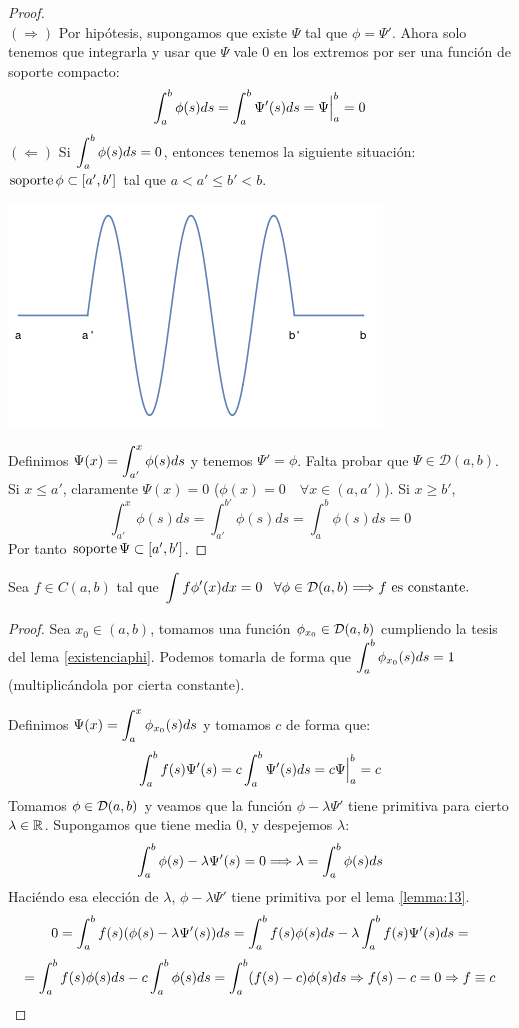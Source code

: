 \begin{proof}
\hfill\\
$(\Rightarrow)$ Por hipótesis, supongamos que existe $\Psi$ tal que $\phi=\Psi'$. Ahora solo tenemos que integrarla y usar que $\Psi$ vale 0 en los extremos por ser una función de soporte compacto:
\[
\displaystyle\int_{ a }^{ b } \phi(s)ds=\displaystyle\int_{ a }^{ b } \Psi'(s)ds=\Psi\Big|_a^b=0
\]
$(\Leftarrow)$  Si $\displaystyle\int_{ a }^{ b } \phi(s)ds=0$, entonces tenemos la siguiente situación: $\operatorname{soporte}\phi\subset[a',b']$ tal que $a<a'\leq b'<b$.

\begin{center}
\includegraphics[scale=0.4]{./img/testfuncion.png}
\end{center}

Definimos $\Psi(x)=\displaystyle\int_{ a' }^{ x } \phi(s)ds$ y tenemos $\Psi'=\phi$. Falta probar que $\Psi\in\mathcal{D}(a,b)$.
Si $x\leq a'$, claramente $\Psi(x)=0$ \big($\phi(x)=0\quad\forall x\in(a,a')$\big). Si $x\geq b'$,
\[
\int_{a'}^x\phi(s)ds=\int_{a'}^{b'}\phi(s)ds=\int_{a}^{b}\phi(s)ds=0
\]
Por tanto $\operatorname{soporte}\Psi\subset[a',b']$.

\end{proof}

\begin{lemma}
\label{lemma:14}
Sea $f\in C(a,b)$ tal que $\displaystyle\int_{  }^{  } f\phi'(x)dx=0\;\;\;\forall\phi\in\mathcal{D}(a,b)\Longrightarrow f \text{ es constante.}$
\end{lemma}

\begin{proof}
Sea $x_0\in(a,b)$, tomamos una función $\phi_{x_0}\in \mathcal{D}(a,b)$ cumpliendo la tesis del lema \ref{existenciaphi}. Podemos tomarla de forma que $\displaystyle\int_{ a }^{ b } \phi_{x_0}(s)ds=1$ (multiplicándola por cierta constante). 

Definimos $\Psi(x)=\displaystyle\int_{ a }^{ x } \phi_{x_0}(s)ds$ y tomamos $c$ de forma que:
\[
\displaystyle\int_{ a }^{ b } f(s)\Psi'(s)=c\displaystyle\int_{ a }^{ b } \Psi'(s)ds=c\Psi\Big|_a^b=c
\]
Tomamos $\phi\in\mathcal{D}(a,b)$ y veamos que la función $\phi-\lambda\Psi'$ tiene primitiva para cierto $\lambda\in\mathbb{R}$. Supongamos que tiene media 0, y despejemos $\lambda$:
\[
\displaystyle\int_{ a }^{ b } \phi(s)-\lambda\Psi'(s)=0 \Longrightarrow \lambda=\displaystyle\int_{ a }^{ b } \phi(s)ds
\]
Haciéndo esa elección de $\lambda$, $\phi-\lambda\Psi'$ tiene primitiva por el lema \ref{lemma:13}.
\[
0=\displaystyle\int_{ a }^{ b } f(s)(\phi(s)-\lambda\Psi'(s))ds=\displaystyle\int_{ a }^{ b } f(s)\phi(s)ds-\lambda\displaystyle\int_{ a }^{ b } f(s)\Psi'(s)ds=
\]
\[
=\displaystyle\int_{ a }^{ b } f(s)\phi(s)ds-c\displaystyle\int_{ a }^{ b } \phi(s)ds=\displaystyle\int_{ a }^{ b } (f(s)-c)\phi(s)ds \Rightarrow f(s)-c=0 \Rightarrow f\equiv c
\]
\end{proof}

